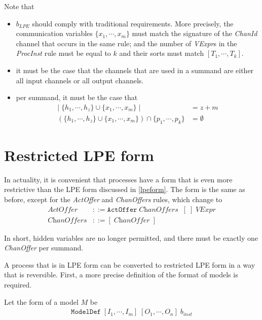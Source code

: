 Note that
\begin{itemize}
\item $b_\textit{LPE}$ should comply with traditional \txs{} requirements.
More precisely, the communication variables $\{ x_1, \cdots{}, x_m \}$ must match the signature of the \textit{ChanId} channel that occurs in the same rule; and the number of \textit{VExpr}s in the \textit{ProcInst} rule must be equal to $k$ and their sorts must match $[T_1, \cdots{}, T_k]$.
\item it must be the case that the channels that are used in a summand are either all input channels or all output channels.
\item per summand, it must be the case that
\begin{align*}
|\; \{ h_1, \cdots{}, h_z \} \cup \{ x_1, \cdots{}, x_m \} \; | &= z + m \\
(\{ h_1, \cdots{}, h_z \} \cup \{ x_1, \cdots{}, x_m \}) \cap \{ p_1, \cdots{}, p_k \} &= \emptyset{}
\end{align*}
\end{itemize}

\section{Restricted LPE form} \label{restrictedlpeform}

In actuality, it is convenient that processes have a form that is even more restrictive than the LPE form discussed in \ref{lpeform}.
The form is the same as before, except for the \textit{ActOffer} and \textit{ChanOffers} rules, which change to
\begin{align*}
\textit{ActOffer} &::= \texttt{ActOffer} \; \textit{ChanOffers} \;\; [\;] \; \textit{VExpr} \\
\textit{ChanOffers} &::= [ \;\! \textit{ChanOffer} \; ]
\end{align*}

In short, hidden variables are no longer permitted, and there must be exactly one \textit{ChanOffer} per summand.

A process that is in LPE form can be converted to restricted LPE form in a way that is reversible.
First, a more precise definition of the format of \txs{} models is required.

Let the form of a \txs{} model $M$ be
\begin{align*}
\texttt{ModelDef} \; [I_1, \cdots{}, I_m] \; [O_1, \cdots{}, O_n] \; b_\textit{inst}
\end{align*}

